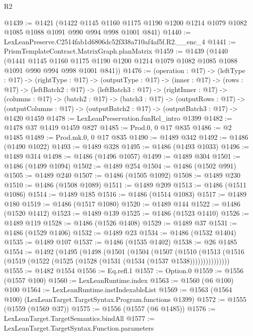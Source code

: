 \begin{lexlean}{R2}
\begin{coremodule}
@1439 := @1421
    (@1422
      @1145
      @1160
      @1175
      @1190
      @1200
      @1214
      @1079
      @1082
      @1085
      @1088
      @1091
      @990
      @994
      @998
      @1001
      @841)
@1440 := LexLeanPreserve.C2514fab1d6806dc52f338a710af4af5f.R2.__enc_4
@1441 := PrismTemplateContract.MatrixGraph.planMatrix
@1459 := @1439
    (@1440
      (@1441
        @1145
        @1160
        @1175
        @1190
        @1200
        @1214
        @1079
        @1082
        @1085
        @1088
        @1091
        @990
        @994
        @998
        @1001
        @841))
@1476 := (operation : @17) ->
  (leftType : @17) ->
  (rightType : @17) ->
  (outputType : @17) ->
  (inner : @17) ->
  (rows : @17) ->
  (leftBatch2 : @17) ->
  (leftBatch3 : @17) ->
  (rightInner : @17) ->
  (columns : @17) ->
  (batch2 : @17) ->
  (batch3 : @17) ->
  (outputRows : @17) ->
  (outputColumns : @17) -> (outputBatch2 : @17) -> (outputBatch3 : @17) -> @1420 @1459
@1478 := LexLeanPreservation.funRel_intro @1399
@1482 := @1478 @37 @1419 @1459 @827
@1485 := Prod.{0, 0} @17 @835
@1486 := @2 @1485
@1489 := Prod.mk.{0, 0} @17 @835
@1490 := @1489 @342
@1492 := @1486 (@1490 @1022)
@1493 := @1489 @328
@1495 := @1486 (@1493 @1033)
@1496 := @1489 @314
@1498 := @1486 (@1496 @1057)
@1499 := @1489 @304
@1501 := @1486 (@1499 @1094)
@1502 := @1489 @254
@1504 := @1486 (@1502 @991)
@1505 := @1489 @240
@1507 := @1486 (@1505 @1092)
@1508 := @1489 @230
@1510 := @1486 (@1508 @1089)
@1511 := @1489 @209
@1513 := @1486 (@1511 @1086)
@1514 := @1489 @185
@1516 := @1486 (@1514 @1083)
@1517 := @1489 @180
@1519 := @1486 (@1517 @1080)
@1520 := @1489 @144
@1522 := @1486 (@1520 @1412)
@1523 := @1489 @139
@1525 := @1486 (@1523 @1410)
@1526 := @1489 @119
@1528 := @1486 (@1526 @1408)
@1529 := @1489 @37
@1531 := @1486 (@1529 @1406)
@1532 := @1489 @23
@1534 := @1486 (@1532 @1404)
@1535 := @1489 @107
@1537 := @1486 (@1535 @1402)
@1538 := @26 @1485
@1554 := @1492
    (@1495
      (@1498
        (@1501
          (@1504
            (@1507
              (@1510
                (@1513 (@1516 (@1519 (@1522 (@1525 (@1528 (@1531 (@1534 (@1537 @1538)))))))))))))))
@1555 := @1482 @1554
@1556 := Eq.refl.{1}
@1557 := Option.{0}
@1559 := @1556 (@1557 @100)
@1560 := LexLeanRuntime.index
@1563 := @1560 (@6 @100) @100
@1564 := LexLeanRuntime.instIndexableList
@1569 := @1563 (@1564 @100) (LexLeanTarget.TargetSyntax.Program.functions @1399)
@1572 := @1555 (@1559 (@1569 @37))
@1575 := @1556 (@1557 (@6 @1485))
@1576 := LexLeanTarget.TargetSemantics.bindAll
@1577 := LexLeanTarget.TargetSyntax.Function.parameters

\end{coremodule}
\end{lexlean}
